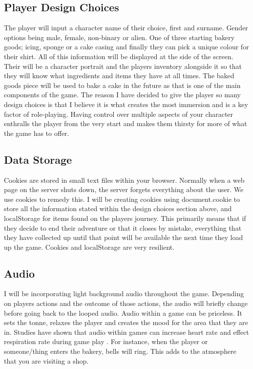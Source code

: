 \documentclass[10pt, a4paper]{article}
\begin{document}
    \subsection{Player Design Choices}
    The player will input a character name of their choice, first and surname. Gender options being male, female, non-binary or alien. One of three starting bakery goods; icing, sponge or a cake casing and finally they can pick a unique colour for their shirt. All of this information will be displayed at the side of the screen. Their will be a character portrait and the players inventory alongside it so that they will know what ingredients and items they have at all times. The baked goods piece will be used to bake a cake in the future as that is one of the main components of the game. The reason I have decided to give the player so many design choices is that I believe it is what creates the most immersion and is a key factor of role-playing. Having control over multiple aspects of your character enthralls the player from the very start and makes them thirsty for more of what the game has to offer.
    
    \subsection{Data Storage}
    Cookies are stored in small text files within your browser. Normally when a web page on the server shuts down, the server forgets everything about the user. We use cookies to remedy this. I will be creating cookies using document.cookie to store all the information stated within the design choices section above, and localStorage for items found on the players journey. This primarily means that if they decide to end their adventure or that it closes by mistake, everything that they have collected up until that point will be available the next time they load up the game. Cookies and localStorage are very resilient. 
    
    \subsection{Audio}
    I will be incorporating light background audio throughout the game. Depending on players actions and the outcome of those actions, the audio will briefly change before going back to the looped audio. Audio within a game can be priceless. It sets the tonne, relaxes the player and creates the mood for the area that they are in. Studies have shown that audio within games can increase heart rate and effect respiration rate during game play \cite{In-GameAudio}. For instance, when the player or someone/thing enters the bakery, bells will ring. This adds to the atmosphere that you are visiting a shop. 
    
\end{document}
